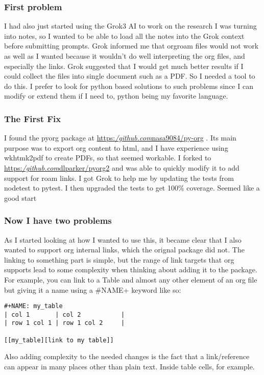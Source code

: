 \documentclass[11pt]{article}
\begin{document}
\subsubsection{First problem  }
 \label{obj-198}
 \label{obj-197}
  I had also just started using the Grok3 AI to work on the research I was turning into notes,
  so I wanted to be able to load all the notes into the Grok context before submitting
  prompts. Grok informed me that orgroam files would not work as well as I wanted because
  it wouldn't do well interpreting the org files, and especially the links. Grok suggested
  that I would get much better results if I could collect the files into single document
  such as a PDF. So I needed a tool to do this. I prefer to look for python based solutions
  to such problems since I can modify or extend them if I need to, python being my favorite
  language.

\subsubsection{The First Fix  }
 \label{obj-210}
 \label{obj-209}
I found the pyorg package at
\href{https://github.com/nasa9084/py-org}{https:\emph{/github.com}nasa9084/py-org}
.
  Its main purpose was to export org content to html, and I have experience using
  wkhtmk2pdf to create PDFs, so that seemed workable. I forked to
\href{https://github.com/dlparker/pyorg2}{https:\emph{/github.com}dlparker/pyorg2}
and was able to quickly modify it to add support
  for roam links.
  I got Grok to help me by updating the tests from nodetest to pytest.
  I then upgraded the tests to get 100\% coverage. Seemed like a good start

\subsubsection{Now I have two problems  }
 \label{obj-230}
 \label{obj-229}
  As I started looking at how I wanted to use this, it became clear that I also wanted to
  support org internal links, which the orignal package did not. The linking to something
  part is simple, but the range of link targets that org supports lead to some complexity
  when thinking about adding it to the package. For example, you can link to a Table and
  almost any other element of an org file but giving it a name using a \#NAME+ keyword like so:

\begin{verbatim}
#+NAME: my_table
| col 1       | col 2           |
| row 1 col 1 | row 1 col 2     |

[[my_table][link to my table]]  
\end{verbatim}
\vspace{\baselineskip}
  Also adding complexity to the needed changes is the fact that a link/reference can
  appear in many places other than plain text. Inside table cells, for example.
\end{document}
